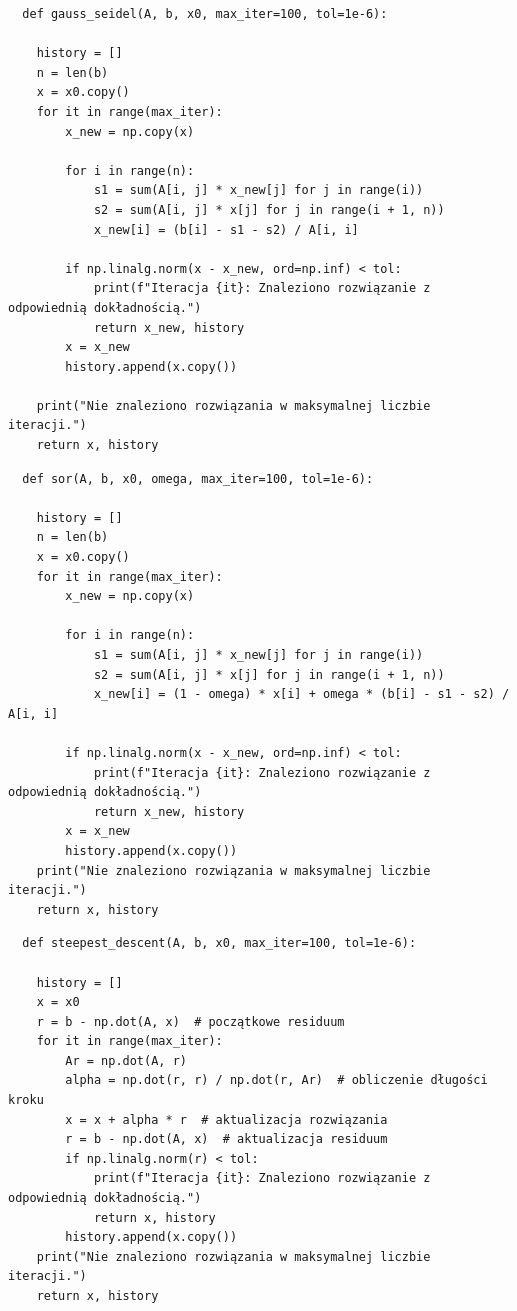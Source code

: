 \documentclass{article}
\begin{document}
\begin{lstlisting}
  def gauss_seidel(A, b, x0, max_iter=100, tol=1e-6):
    
    history = []
    n = len(b)
    x = x0.copy()
    for it in range(max_iter):
        x_new = np.copy(x)

        for i in range(n):
            s1 = sum(A[i, j] * x_new[j] for j in range(i))
            s2 = sum(A[i, j] * x[j] for j in range(i + 1, n))
            x_new[i] = (b[i] - s1 - s2) / A[i, i]

        if np.linalg.norm(x - x_new, ord=np.inf) < tol:
            print(f"Iteracja {it}: Znaleziono rozwiązanie z odpowiednią dokładnością.")
            return x_new, history
        x = x_new
        history.append(x.copy())

    print("Nie znaleziono rozwiązania w maksymalnej liczbie iteracji.")
    return x, history
\end{lstlisting}
\begin{lstlisting}
  def sor(A, b, x0, omega, max_iter=100, tol=1e-6):
    
    history = []
    n = len(b)
    x = x0.copy()
    for it in range(max_iter):
        x_new = np.copy(x)

        for i in range(n):
            s1 = sum(A[i, j] * x_new[j] for j in range(i))
            s2 = sum(A[i, j] * x[j] for j in range(i + 1, n))
            x_new[i] = (1 - omega) * x[i] + omega * (b[i] - s1 - s2) / A[i, i]

        if np.linalg.norm(x - x_new, ord=np.inf) < tol:
            print(f"Iteracja {it}: Znaleziono rozwiązanie z odpowiednią dokładnością.")
            return x_new, history
        x = x_new
        history.append(x.copy())
    print("Nie znaleziono rozwiązania w maksymalnej liczbie iteracji.")
    return x, history
\end{lstlisting}
\begin{lstlisting}
  def steepest_descent(A, b, x0, max_iter=100, tol=1e-6):
    
    history = []
    x = x0
    r = b - np.dot(A, x)  # początkowe residuum
    for it in range(max_iter):
        Ar = np.dot(A, r)
        alpha = np.dot(r, r) / np.dot(r, Ar)  # obliczenie długości kroku
        x = x + alpha * r  # aktualizacja rozwiązania
        r = b - np.dot(A, x)  # aktualizacja residuum
        if np.linalg.norm(r) < tol:
            print(f"Iteracja {it}: Znaleziono rozwiązanie z odpowiednią dokładnością.")
            return x, history
        history.append(x.copy())
    print("Nie znaleziono rozwiązania w maksymalnej liczbie iteracji.")
    return x, history
\end{lstlisting}
\end{document}
